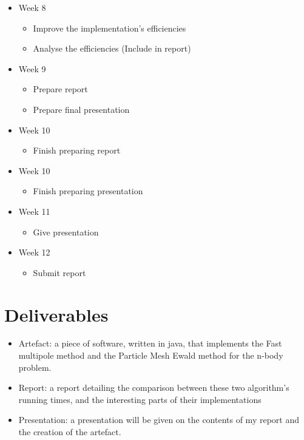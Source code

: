 \documentclass[11pt,a4paper,oneside]{article}
\begin{document}
\begin{itemize}
\begin{itemize}
    \end{itemize}
\item Week 8
    \begin{itemize}
    \item Improve the implementation's efficiencies
    \item Analyse the efficiencies (Include in report)
    \end{itemize}
\item Week 9
    \begin{itemize}
    \item Prepare report
    \item Prepare final presentation
    \end{itemize}
\item Week 10
    \begin{itemize}
    \item Finish preparing report
    \end{itemize}
\item Week 10
    \begin{itemize}
    \item Finish preparing presentation
    \end{itemize}
\item Week 11
    \begin{itemize}
    \item Give presentation
    \end{itemize}
\item Week 12
    \begin{itemize}
    \item Submit report
    \end{itemize}
\end{itemize}
\section*{Deliverables}
\begin{itemize}
\item Artefact: a piece of software, written in java, that implements the Fast multipole method and the Particle Mesh Ewald method for the n-body problem.
\item Report: a report detailing the comparison between these two algorithm's running times, and the interesting parts of their implementations
\item Presentation: a presentation will be given on the contents of my report and the creation of the artefact.
\end{itemize}
\end{document}

